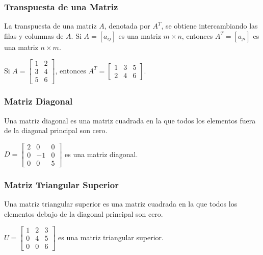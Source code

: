 \subsubsection{Transpuesta de una Matriz}

La transpuesta de una matriz $A$, denotada por $A^T$, se obtiene intercambiando las filas y columnas de $A$.  Si $A = [a_{ij}]$ es una matriz $m \times n$, entonces $A^T = [a_{ji}]$ es una matriz $n \times m$.

\begin{example}
	Si $A = \begin{bmatrix} 1 & 2 \\ 3 & 4 \\ 5 & 6 \end{bmatrix}$, entonces 
	$A^T = \begin{bmatrix} 1 & 3 & 5 \\ 2 & 4 & 6 \end{bmatrix}$.
\end{example}

\subsubsection{Matriz Diagonal}

Una matriz diagonal es una matriz cuadrada en la que todos los elementos fuera de la diagonal principal son cero.

\begin{example}
	$D = \begin{bmatrix} 2 & 0 & 0 \\ 0 & -1 & 0 \\ 0 & 0 & 5 \end{bmatrix}$ es una matriz diagonal.
\end{example}

\subsubsection{Matriz Triangular Superior}

Una matriz triangular superior es una matriz cuadrada en la que todos los elementos debajo de la diagonal principal son cero.

\begin{example}
	$U = \begin{bmatrix} 1 & 2 & 3 \\ 0 & 4 & 5 \\ 0 & 0 & 6 \end{bmatrix}$ es una matriz triangular superior.
\end{example}

